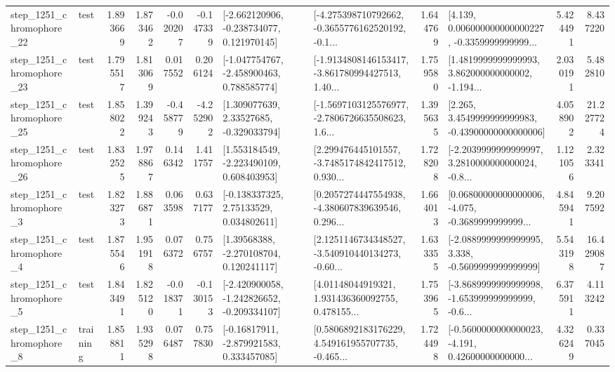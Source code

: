 \begin{tabular}{llrrrrllrlrr}
 step\_1251\_chromophore\_22 &      test &      1.893669 &    1.873462 &     -0.020207 & -0.147339 &   [-2.662120906, -0.238734077, 0.121970145] &  [-4.275398710792662, -0.3655776162520192, -0.1... &       1.644769 &  [4.139, 0.006000000000000227, -0.3359999999999... &            5.424491 &          8.437220 \\
 step\_1251\_chromophore\_23 &      test &      1.795517 &    1.813069 &      0.017552 &  0.206124 &   [-1.047754767, -2.458900463, 0.788585774] &  [-1.9134808146153417, -3.861780994427513, 1.40... &       1.759580 &  [1.4819999999999993, 3.862000000000002, -1.194... &            2.030191 &          5.482810 \\
 step\_1251\_chromophore\_25 &      test &      1.858022 &    1.399243 &     -0.458779 & -4.252902 &     [1.309077639, 2.33527685, -0.329033794] &  [-1.5697103125576977, -2.7806726635508623, 1.6... &       1.395635 &  [2.265, 3.4549999999999983, -0.43900000000000006] &            4.058902 &         21.227724 \\
 step\_1251\_chromophore\_26 &      test &      1.832525 &    1.978867 &      0.146342 &  1.411757 &    [1.553184549, -2.223490109, 0.608403953] &  [2.299476445101557, -3.7485174842417512, 0.930... &       1.728208 &  [-2.2039999999999997, 3.2810000000000024, -0.8... &            1.121056 &          2.323341 \\
  step\_1251\_chromophore\_3 &      test &      1.823273 &    1.886871 &      0.063598 &  0.637177 &     [-0.138337325, 2.75133529, 0.034802611] &  [0.2057274447554938, -4.380607839639546, 0.296... &       1.664013 &  [0.06800000000000006, -4.075, -0.3689999999999... &            4.845941 &          9.207592 \\
  step\_1251\_chromophore\_4 &      test &      1.875546 &    1.951918 &      0.076372 &  0.756757 &     [1.39568388, -2.270108704, 0.120241117] &  [2.1251146734348527, -3.540910440134273, -0.60... &       1.633355 &  [-2.0889999999999995, 3.338, -0.5609999999999999] &            5.543198 &         16.429087 \\
  step\_1251\_chromophore\_5 &      test &      1.843491 &    1.825120 &     -0.018371 & -0.130153 &  [-2.420900058, -1.242826652, -0.209334107] &  [4.01148044919321, 1.931436360092755, 0.478155... &       1.753965 &  [-3.8689999999999998, -1.653999999999999, -0.6... &            6.375911 &          4.113242 \\
  step\_1251\_chromophore\_8 &  training &      1.858811 &    1.935298 &      0.076487 &  0.757830 &    [-0.16817911, -2.879921583, 0.333457085] &  [0.5806892183176229, 4.549161955707735, -0.465... &       1.724498 &  [-0.5600000000000023, -4.191, 0.42600000000000... &            4.326249 &          0.337045 \\

\end{tabular}
